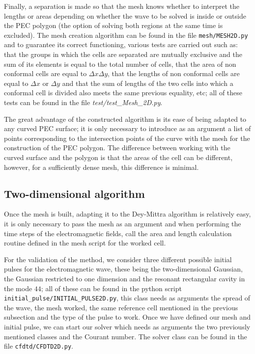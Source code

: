 \documentclass[12pt, oneside]{book}
\begin{document}
Finally, a separation is made so that the mesh knows whether to interpret the lengths or areas depending on whether the wave to be solved is inside or outside the PEC polygon (the option of solving both regions at the same time is excluded). The mesh creation algorithm can be found in the file \texttt{mesh/MESH2D.py} and to guarantee its correct functioning, various tests are carried out such as: that the groups in which the cells are separated are mutually exclusive and the sum of its elements is equal to the total number of cells, that the area of non conformal cells are equal to $\Delta x \Delta y$, that the lengths of non conformal cells are equal to $\Delta x$ or $\Delta y$ and that the sum of lengths of the two cells into which a conformal cell is divided also meets the same previous equality, etc; all of these tests can be found in the file \textit{test/test\_Mesh\_2D.py}. 

The great advantage of the constructed algorithm is its ease of being adapted to any curved PEC surface; it is only necessary to introduce as an argument a list of points corresponding to the intersection points of the curve with the mesh for the construction of the PEC polygon. The difference between working with the curved surface and the polygon is that the areas of the cell can be different, however, for a sufficiently dense mesh, this difference is minimal.

\subsection{Two-dimensional algorithm}

Once the mesh is built, adapting it to the Dey-Mittra algorithm is relatively easy, it is only necessary to pass the mesh as an argument and when performing the time steps of the electromagnetic fields, call the area and length calculation routine defined in the mesh script for the worked cell. 

For the validation of the method, we consider three different possible initial pulses for the electromagnetic wave, these being the two-dimensional Gaussian, the Gaussian restricted to one dimension and the resonant rectangular cavity in the mode $44$; all of these can be found in the python script \texttt{initial\_pulse/INITIAL\_PULSE2D.py}, this class needs as arguments the spread of the wave, the mesh worked, the same reference cell mentioned in the previous subsection and the type of the pulse to work. Once we have defined our mesh and initial pulse, we can start our solver which needs as arguments the two previously mentioned classes and the Courant number. The solver class can be found in the file \texttt{cfdtd/CFDTD2D.py}.
\end{document}
